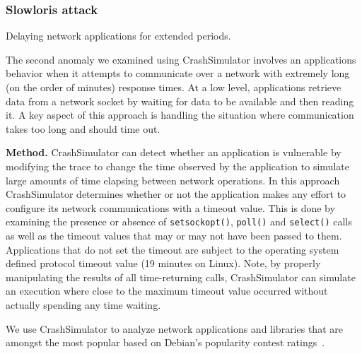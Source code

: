 \subsubsection{Slowloris attack} Delaying network applications for extended
periods.




The second anomaly we examined using CrashSimulator
involves an applications behavior when it attempts to communicate over a network
with extremely long (on the order of minutes) response times.  At a low level,
applications retrieve data from a network socket by waiting for data to be
available and then reading it.  A key aspect of this approach is handling the 
situation where communication takes too long and should time out.

{\bf Method.}
CrashSimulator can detect whether an application is vulnerable by modifying
the trace to change the time observed by the application to simulate large
amounts of time elapsing between network operations.
In this approach CrashSimulator determines
whether or not the application makes any effort to configure its network
communications with a timeout value. This is done by examining the presence or
absence of {\tt setsockopt()}, {\tt poll()} and {\tt select()} calls as well as
the timeout values that may or may not have been passed to them. Applications
that do not set the timeout are subject to the operating
system defined protocol timeout value (19 minutes on Linux).
Note, by properly manipulating the results of all
time-returning calls, CrashSimulator can simulate an execution where close to
the maximum timeout value occurred without actually spending any time
waiting.


We use CrashSimulator to analyze  network applications and libraries
that are amongst the most popular based on Debian's popularity contest 
ratings~\cite{DebPopCon}. 

